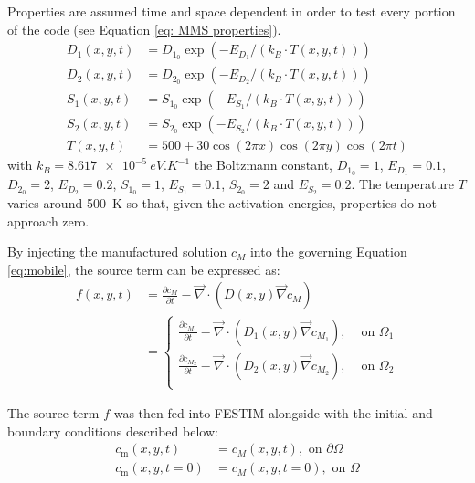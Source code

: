 Properties are assumed time and space dependent in order to test every portion of the code (see Equation \ref{eq: MMS properties}).
\begin{subequations}
    \begin{align}
        D_1(x, y, t) & =  D_{1_0} \exp(-E_{D_1}/(k_B \cdot T(x,y, t) )) \\
        D_2(x, y, t) & =  D_{2_0} \exp(-E_{D_2}/(k_B \cdot T(x,y, t) )) \\
        S_1(x, y, t) & =  S_{1_0} \exp(-E_{S_1}/(k_B \cdot T(x,y, t) )) \\
        S_2(x, y, t) & =  S_{2_0} \exp(-E_{S_2}/(k_B \cdot T(x,y, t) )) \\
        T(x, y, t) & = 500 + 30 \cos(2\pi x) \cos(2 \pi y) \cos(2 \pi t)
\end{align} \label{eq: MMS properties}
\end{subequations}
with ${k_B = \SI{8.617e-5}{eV.K^{-1}}}$ the Boltzmann constant, $D_{1_0} = 1$, $E_{D_1} = 0.1$, $D_{2_0} = 2$, $E_{D_2} = 0.2$, $S_{1_0} = 1$, $E_{S_1} = 0.1$, $S_{2_0} = 2$ and $E_{S_2} = 0.2$.
The temperature $T$ varies around \SI{500}{K} so that, given the activation energies, properties do not approach zero.

By injecting the manufactured solution $c_M$ into the governing Equation \ref{eq:mobile}, the source term can be expressed as:
\begin{align}
    f(x, y, t) &= \frac{\partial c_M}{\partial t} - \vec{\nabla} \cdot\left(D(x, y)
    \vec{\nabla}c_M\right) \nonumber \\
    &= \begin{cases}
        \frac{\partial c_{M_1}}{\partial t} - \vec{\nabla} \cdot\left(D_1(x, y)
    \vec{\nabla}c_{M_1}\right),& \text{ on } \Omega_1\\
    \frac{\partial c_{M_2}}{\partial t} - \vec{\nabla} \cdot\left(D_2(x, y)
    \vec{\nabla}c_{M_2}\right),& \text{ on } \Omega_2\\
    \end{cases}
\end{align}

The source term $f$ was then fed into FESTIM alongside with the initial and boundary conditions described below:
\begin{subequations}
    \begin{align}
        c_\mathrm{m}(x, y, t) &= c_M(x, y, t), \text{ on } \partial \Omega \\
        c_\mathrm{m}(x, y, t=0) &= c_M(x, y, t=0), \text{ on } \Omega
    \end{align}
\end{subequations}

